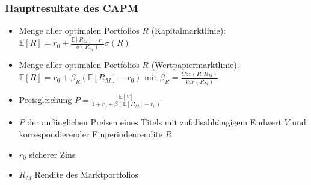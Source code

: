 \documentclass[12pt]{report}
\theoremstyle{dotless}
\theoremstyle{definition}
\begin{document}
\subsubsection{Hauptresultate des CAPM}

\begin{itemize}
	\item Menge aller optimalen Portfolios $R$ (Kapitalmarktlinie): $\mathbb{E}[R] = r_0 + \frac{\mathbb{E}[R_M] - r_0}{\sigma(R_M)}\sigma(R)$
	\item Menge aller optimalen Portfolios $R$ (Wertpapiermarktlinie): $\mathbb{E}[R] = r_0 + \beta_R(\mathbb{E}[R_M] - r_0)$ mit $\beta_R = \frac{Cov(R,R_M)}{Var(R_M)}$
	\item Preisgleichung $P= \frac{\mathbb{E}[V]}{1+r_0+\beta(\mathbb{E}[R_M]-r_0)}$ 
	\item $P$ der anf\"anglichen Preisen eines Titels mit zufallsabh\"angigem Endwert $V$ und korrespondierender Einperiodenrendite $R$
	\item $r_0$ sicherer Zins
	\item $R_M$ Rendite des Marktportfolios
\end{itemize}
\end{document}
